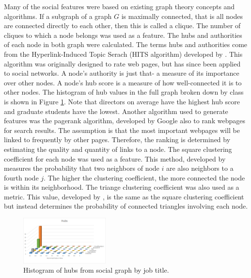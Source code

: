\documentclass{article}
\begin{document}
Many of the social features were based on existing graph theory concepts and algorithms. If a subgraph of a graph $G$ is maximally connected, that is all nodes are connected directly to each other, then this is called a clique.  The number of cliques to which a node belongs was used as a feature.  The hubs and authorities of each node in both graph were calculated.  The terms hubs and authorities come from the Hyperlink-Induced Topic Serach (HITS algorithm) developed by \cite{kleinberg_hubs_1999}.  This algorithm was originally designed to rate web pages, but has since been applied to social networks. A node's authority is just that- a measure of its importance over other nodes.  A node's hub score is a measure of how well-connected it is to other nodes.  The histogram of hub values in the full graph broken down by class is shown in Figure \ref{fig:social_ex_hist}.  Note that directors on average have the highest hub score and graduate students have the lowest. Another algorithm used to generate features was the pagerank algorithm, developed by Google \cite{page_pagerank_1999} also to rank webpages for search results.  The assumption is that the most important webpages will be linked to frequently by other pages.  Therefore, the ranking is determined by estimating the quality and quantity of links to a node.  The square clustering coefficient for each node was used as a feature.  This method, developed by \cite{lind_cycles_2005} measures the probability that two neighbors of node $i$ are also neighbors to a fourth node $j$.  The higher the clustering coefficient, the more connected the node is within its neighborhood.  The triange clustering coefficient was also used as a metric.  This value, developed by \cite{saramaki_generalizations_2007}, is the same as the square clustering coefficient but instead determines the probability of connected triangles involving each node.

\begin{figure}[H]
    \centering
        \includegraphics[width=0.4\textwidth]{Hubs_hist}
        \caption{Histogram of hubs from social graph by job title.}
        \label{fig:social_ex_hist}
\end{figure}
\end{document}
